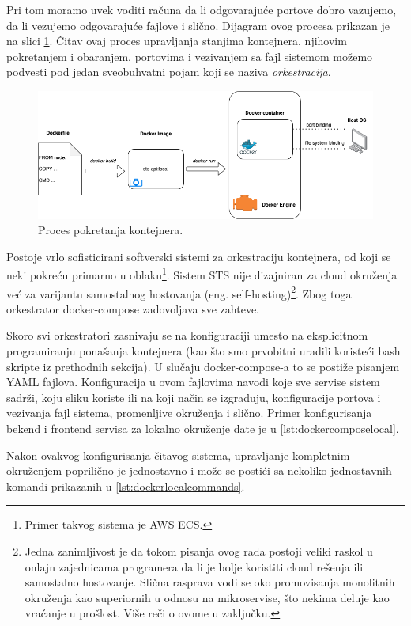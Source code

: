 \documentclass[12pt,oneside]{memoir}
\begin{document}
Pri tom moramo uvek voditi računa da li odgovarajuće portove dobro vazujemo, da li vezujemo odgovarajuće fajlove i slično. Dijagram ovog procesa prikazan je na slici \ref{fig:dockermanual}. Čitav ovaj proces upravljanja stanjima kontejnera, njihovim pokretanjem i obaranjem, portovima i vezivanjem sa fajl sistemom možemo podvesti pod jedan sveobuhvatni pojam koji se naziva \textit{orkestracija}.

\begin{figure}[h]
  \centering
  \includegraphics[width=1\textwidth]{docs/images/ch_6/dockermanual.png} 
  \caption{Proces pokretanja kontejnera.}
  \label{fig:dockermanual}
\end{figure}

Postoje vrlo sofisticirani softverski sistemi za orkestraciju kontejnera, od koji se neki pokreću primarno u oblaku\footnote{Primer takvog sistema je AWS ECS.}. Sistem STS nije dizajniran za cloud okruženja već za varijantu samostalnog hostovanja (eng. self-hosting)\footnote{Jedna zanimljivost je da tokom pisanja ovog rada postoji veliki raskol u onlajn zajednicama programera da li je bolje koristiti cloud rešenja ili samostalno hostovanje. Slična rasprava vodi se oko promovisanja monolitnih okruženja kao superiornih u odnosu na mikroservise, što nekima deluje kao vraćanje u prošlost. Više reči o ovome u zaključku.}. Zbog toga orkestrator docker-compose zadovoljava sve zahteve.

Skoro svi orkestratori zasnivaju se na konfiguraciji umesto na eksplicitnom programiranju ponašanja kontejnera (kao što smo prvobitni uradili koristeći bash skripte iz prethodnih sekcija). U slučaju docker-compose-a to se postiže pisanjem YAML fajlova. Konfiguracija u ovom fajlovima navodi koje sve servise sistem sadrži, koju sliku koriste ili na koji način se izgrađuju, konfiguracije portova i vezivanja fajl sistema, promenljive okruženja i slično. Primer konfigurisanja bekend i frontend servisa za lokalno okruženje date je u \ref{lst:dockercomposelocal}.

Nakon ovakvog konfigurisanja čitavog sistema, upravljanje kompletnim okruženjem poprilično je jednostavno i može se postići sa nekoliko jednostavnih komandi prikazanih u \ref{lst:dockerlocalcommands}.
\end{document}
